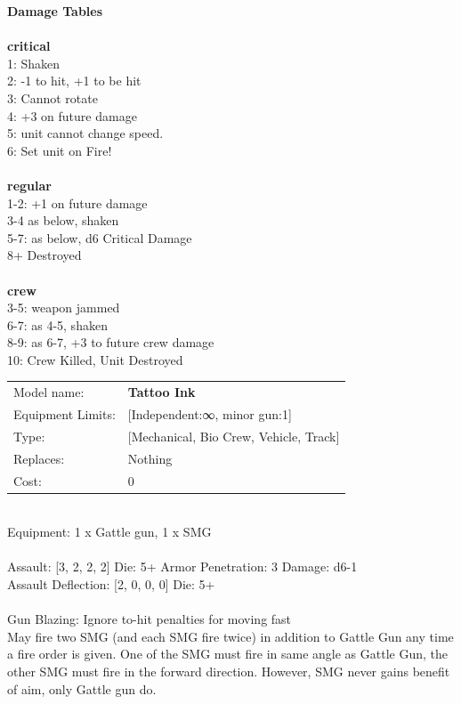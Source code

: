 {\bf Damage Tables} \\
\ \\ {\bf critical } \\
1: Shaken \\
2: -1 to hit, +1 to be hit \\
3: Cannot rotate \\
4: +3 on future damage \\
5: unit cannot change speed. \\
6: Set unit on Fire! \\
\ \\ {\bf regular } \\
1-2: +1 on future damage \\
3-4 as below, shaken \\
5-7: as below, d6 Critical Damage \\
8+ Destroyed \\
\ \\ {\bf crew } \\
3-5: weapon jammed \\
6-7: as 4-5, shaken \\
8-9: as 6-7, +3 to future crew damage \\
10: Crew Killed, Unit Destroyed \\


\noindent
\begin{tabular}{ll}
Model name: &{\bf Tattoo Ink } \\
Equipment Limits: &[Independent:∞, minor gun:1] \\
Type: &[Mechanical, Bio Crew, Vehicle, Track] \\
Replaces: &Nothing \\
Cost: & 0\\
\end{tabular}
\ \\
Equipment: 1 x Gattle gun, 1 x SMG \\
\ \\
Assault: [3, 2, 2, 2] Die: 5+ Armor Penetration: 3 Damage: d6-1 \\
Assault Deflection: [2, 0, 0, 0] Die: 5+\\
\indent  
\ \\
Gun Blazing: Ignore to-hit penalties for moving fast\\ 
May fire two SMG (and each SMG fire twice) in addition to Gattle Gun any time a fire order is given. One of the SMG must fire in same angle as Gattle Gun, the other SMG must fire in the forward direction. However, SMG never gains benefit of aim, only Gattle gun do.\\ 

